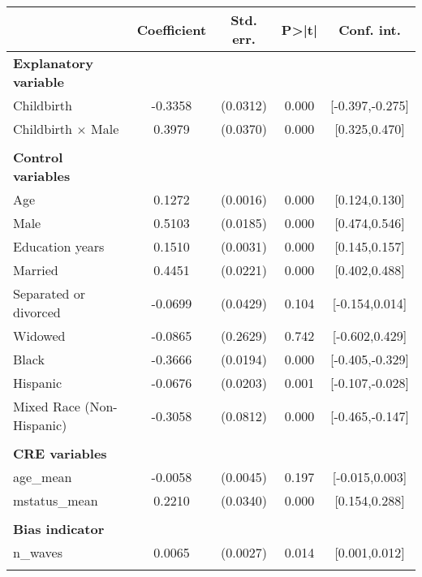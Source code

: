 {
\def\sym#1{\ifmmode^{#1}\else\(^{#1}\)\fi}
\begin{tabular}{l*{1}{cccc}}
\toprule
                    & Coefficient&   Std. err.&       P>|t|&  Conf. int.\\
\midrule
\textbf{Explanatory variable}&            &            &            &            \\
Childbirth          &     -0.3358&    (0.0312)&       0.000&[-0.397,-0.275]\\
Childbirth $\times$ Male&      0.3979&    (0.0370)&       0.000&[0.325,0.470]\\
\\ \textbf{Control variables}&            &            &            &            \\
Age                 &      0.1272&    (0.0016)&       0.000&[0.124,0.130]\\
Male                &      0.5103&    (0.0185)&       0.000&[0.474,0.546]\\
Education years     &      0.1510&    (0.0031)&       0.000&[0.145,0.157]\\
Married             &      0.4451&    (0.0221)&       0.000&[0.402,0.488]\\
Separated or divorced&     -0.0699&    (0.0429)&       0.104&[-0.154,0.014]\\
Widowed             &     -0.0865&    (0.2629)&       0.742&[-0.602,0.429]\\
Black               &     -0.3666&    (0.0194)&       0.000&[-0.405,-0.329]\\
Hispanic            &     -0.0676&    (0.0203)&       0.001&[-0.107,-0.028]\\
Mixed Race (Non-Hispanic)&     -0.3058&    (0.0812)&       0.000&[-0.465,-0.147]\\
\\ \textbf{CRE variables}&            &            &            &            \\
age\_mean            &     -0.0058&    (0.0045)&       0.197&[-0.015,0.003]\\
mstatus\_mean        &      0.2210&    (0.0340)&       0.000&[0.154,0.288]\\
\\ \textbf{Bias indicator}&            &            &            &            \\
n\_waves             &      0.0065&    (0.0027)&       0.014&[0.001,0.012]\\
                    &            &            &            &            \\

\end{tabular}}
